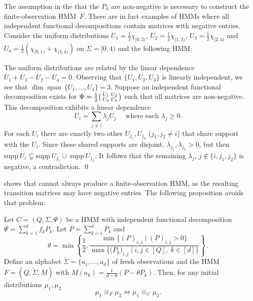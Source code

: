 \documentclass[a4paper,UKenglish,cleveref, autoref,mathscr]{lipics-v2019}
\newcommand{\1}{\mathbbm{1}}
\newcommand{\supp}{\mathrm{supp}}
\DeclareMathOperator{\Span}{span\,}
\begin{document}
\begin{example}\label{negdecompex}
The assumption in the  that the $P_k$ are non-negative is necessary to construct the finite-observation HMM~$F$. There are in fact examples of HMMs where all independent functional decompositions contain matrices with negative entries. Consider the uniform distributions $U_1 = \frac{1}{2}\chi_{[0,2)}$, $U_2 = \frac{1}{2}\chi_{[1,3)}$, $U_3 = \frac{1}{2}\chi_{[2,4)}$ and $U_4 = \frac{1}{2}(\chi_{[0,1)} + \chi_{[3,4)})$ on $\Sigma = [0,4)$ and the following HMM:
\begin{center}
\end{center}
The uniform distributions are related by the linear dependence $U_1 + U_3 - U_2 - U_4 = 0$.
Observing that $\{U_1, U_2, U_3\}$ is linearly independent, we see that $\dim \Span \{U_1, \dots, U_4\} = 3$. Suppose an independent functional decomposition exists for $\Psi = \frac12 \begin{psmallmatrix}U_1&U_2\\U_3&U_4\end{psmallmatrix}$ such that all matrices are non-negative. This decomposition exhibits a linear dependence
\[U_i = \sum_{j \neq i} \lambda_j U_j \quad \text{ where each }\lambda_j \geq 0.\]
For each $U_i$ there are exactly two other $U_{j_1}, U_{j_2}$ ($j_1, j_2 \neq i$) that share support with the $U_i$. Since these shared supports are disjoint, $\lambda_{j_1},\lambda_{j_2} > 0$, but then $\supp~U_i \subsetneq \supp~U_{j_1} \cup ~\supp~U_{j_2}$.
It follows that the remaining $\lambda_j$, $j \notin \{i, j_1, j_2\}$ is negative, a contradiction.
\qed
\end{example}
 shows that  cannot always produce a finite-observation HMM, as the resulting transition matrices may have negative entries.
The following proposition avoids that problem:
%
\begin{proposition}\label{reductiontime}
Let $C = (Q,\Sigma,\Psi)$ be a HMM with independent functional decomposition $\Psi = \sum_{k = 1}^d f_k P_k$. Let $P = \sum_{k = 1}^d P_k$ and
\[\theta = \min \left\{ \frac12, \frac{\min \{(P)_{i,j} \mid (P)_{i,j} > 0\}}{\max \{ \big(P_k\big)_{i,j} \mid i,j \in [Q],\ k \in [d] \} } \right\}\,. \]
Define an alphabet $\tilde{\Sigma} = \{a_1, \dots, a_d\}$ of fresh observations and the HMM $F = (Q, \tilde{\Sigma}, M)$ with $M(a_k) = \frac{1}{d - \theta}(P - \theta P_k)$. Then, for any initial distributions $\mu_1, \mu_2$
\[\mu_1 \equiv_F \mu_2 \iff \mu_1 \equiv_C \mu_2.\]
\end{proposition}
\end{document}
